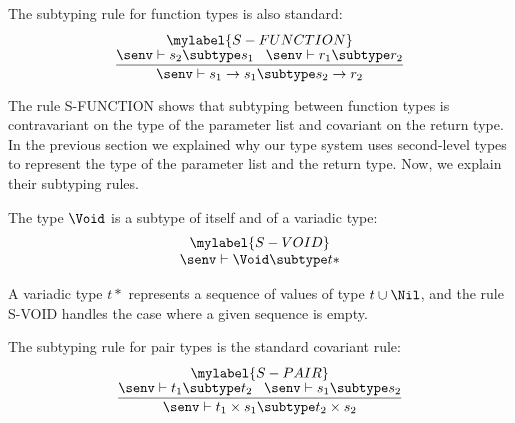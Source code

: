The subtyping rule for function types is also standard:
\[
\begin{array}{c}
\mylabel{S-FUNCTION}\\
\dfrac{\senv \vdash s_{2} \subtype s_{1} \;\;\;
       \senv \vdash r_{1} \subtype r_{2}}
      {\senv \vdash s_{1} \rightarrow s_{1} \subtype s_{2} \rightarrow r_{2}}
\end{array}
\]

The rule \textsc{S-FUNCTION} shows that subtyping between
function types is contravariant on the type of the parameter list
and covariant on the return type.
In the previous section we explained why our type system uses
second-level types to represent the type of the parameter list
and the return type.
Now, we explain their subtyping rules.

The type $\Void$ is a subtype of itself and of a variadic type:
\[
\begin{array}{c}
\mylabel{S-VOID}\\
\senv \vdash \Void \subtype t{*}
\end{array}
\]

A variadic type $t{*}$ represents a sequence of values of type
$t \cup \Nil$, and the rule \textsc{S-VOID} handles the case where
a given sequence is empty.

The subtyping rule for pair types is the standard covariant rule:
\[
\begin{array}{c}
\mylabel{S-PAIR}\\
\dfrac{\senv \vdash t_{1} \subtype t_{2} \;\;\;
       \senv \vdash s_{1} \subtype s_{2}}
      {\senv \vdash t_{1} \times s_{1} \subtype t_{2} \times s_{2}}
\end{array}
\]

